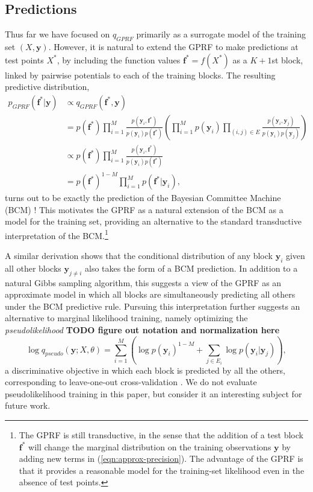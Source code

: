 \documentclass{article}
\renewcommand{\v}[1]{\mathbf{#1}}
\begin{document}
\subsection{Predictions}
\label{sec:approx-predict}

Thus far we have focused on $q_{GPRF}$ primarily as a surrogate model
of the training set $(X, \v{y})$.  However, it is natural to extend
the GPRF to make predictions at test points $X^*$, by including the
function values $\v{f}^* = f(X^*)$ as a $K+1$st block, linked by
pairwise potentials to each of the training blocks. The resulting
predictive distribution,
\begin{align}
p_{GPRF}(\v{f}^* | \v{y}) &\propto q_{GPRF}(\v{f}^*, \v{y}) \\
&= p(\v{f}^*) \prod_{i=1}^M \frac{p(\v{y}_i,
  \v{f}^*)}{p(\v{y}_i) p(\v{f}^*)} \left(\prod_{i=1}^M p(\v{y}_i) \prod_{(i,j)\in E} \frac{p(\v{y}_i, \v{y}_j)}{p(\v{y}_i)
    p(\v{y}_j)}\right)  \\
&\propto p(\v{f}^*) \prod_{i=1}^M \frac{p(\v{y}_i,
  \v{f}^*)}{p(\v{y}_i) p(\v{f}^*)}\\
&=p(\v{f}^*)^{1-M} \prod_{i=1}^M p(\v{f}^* | \v{y}_i),
\end{align}
turns out to be exactly the prediction of 
the Bayesian Committee Machine (BCM) \citep{bcm}! This motivates the
GPRF as a natural extension of the BCM as a model for the training
set, providing an alternative to the standard transductive
interpretation of the BCM.\footnote{The GPRF is still transductive, in
  the sense that the addition of a test block $\v{f^*}$ will change the
  marginal distribution on the training observations $\v{y}$ by
  adding new terms in (\ref{eqn:approx-precision}). The
  advantage of the GPRF is that it provides a reasonable model for
  the training-set likelihood even in the absence of test
  points. }

A similar derivation shows that the conditional distribution of any
block $\v{y}_i$ given all other blocks $\v{y}_{j\ne i}$ also takes the
form of a BCM prediction. In addition to a natural Gibbs sampling
algorithm, this suggests a view of the GPRF as an approximate model in which all blocks are
simultaneously predicting all others under the BCM
predictive rule. Pursuing this interpretation further suggests an alternative to marginal likelihood training, namely optimizing the
{\em pseudolikelihood} \cite{besag} {\bf TODO figure out notation and
  normalization here}
\begin{equation}
\log q_{pseudo} (\v{y}; X, \theta)= \sum_{i=1}^M \left (\log p(\v{y}_i)^{1-M} + \sum_{j\in
  E_i} \log p(\v{y}_i | \v{y}_j) \right), 
\end{equation}
a discriminative objective in which each block is predicted by all the
others, corresponding to leave-one-out
cross-validation \cite{rasmussen_williams}. We do not evaluate
pseudolikelihood training in this paper, but consider it an
interesting subject for future work. 
\end{document}
